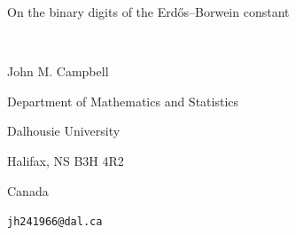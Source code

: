 \documentclass[12pt]{article}
\begin{document}
\begin{center}
{\large On the binary digits of the Erd\H{o}s--Borwein constant}

 \ 
 
{\sc John M. Campbell}

\vspace{0.1in}

{\footnotesize Department of Mathematics and Statistics}

{\footnotesize Dalhousie University}

{\footnotesize Halifax, NS B3H 4R2}

{\footnotesize Canada}

\vspace{0.1in}

{\footnotesize {\tt jh241966@dal.ca}}

\vspace{0.1in}

\end{center}

\begin{abstract}
 In a landmark paper on arithmetical properties of Lambert series, Erd\H{o}s proved that $ \sum_{n=1}^{\infty} \frac{1}{2^{n} - 1}$ is 
 irrational. This value $E$ is now referred to as the \emph{Erd\H{o}s--Borwein constant}. Crandall, in 2012, studied properties of the 
 base-2 expansion of this constant, and left the following as an open problem: Does the string $11$ occur infinitely often in the base-2 
 expansion of $E$? This open problem was also subsequently noted by Shallit. We succeed in introducing a full proof that solves 
 Crandall's problem in the affirmative. Our proof combines a congruence construction in the spirit of Erd\H{o}s and an estimate due to 
 Alford, Granville, and Pomerance for the counting function for primes in arithmetic progressions. Our argument was developed through 
 extensive interactions with GPT-5.5 Pro. 
\end{abstract}

\vspace{0.1in}


\vspace{0.1in}

\end{document}
